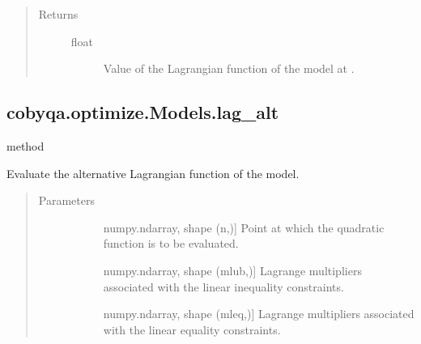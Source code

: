 \documentclass[letterpaper,10pt,english]{sphinxmanual}
\begin{document}
\begin{fulllineitems}
\begin{fulllineitems}
\begin{quote}
\begin{description}
\item[{Returns}] \leavevmode\begin{description}
\item[{float}] \leavevmode
\sphinxAtStartPar
Value of the Lagrangian function of the model at .

\end{description}

\end{description}\end{quote}

\end{fulllineitems}



\subsection{cobyqa.optimize.Models.lag\_alt}
\label{\detokenize{refs/generated/cobyqa.optimize.Models.lag_alt:cobyqa-optimize-models-lag-alt}}\label{\detokenize{refs/generated/cobyqa.optimize.Models.lag_alt::doc}}
\sphinxAtStartPar
method

\begin{fulllineitems}
\label{\detokenize{refs/generated/cobyqa.optimize.Models.lag_alt:cobyqa.optimize.Models.lag_alt}}
\sphinxAtStartPar
Evaluate the alternative Lagrangian function of the model.
\begin{quote}\begin{description}
\item[{Parameters}] \leavevmode\begin{description}
\item[{}] \leavevmode{[}numpy.ndarray, shape (n,){]}
\sphinxAtStartPar
Point at which the quadratic function is to be evaluated.

\item[{}] \leavevmode{[}numpy.ndarray, shape (mlub,){]}
\sphinxAtStartPar
Lagrange multipliers associated with the linear inequality
constraints.

\item[{}] \leavevmode{[}numpy.ndarray, shape (mleq,){]}
\sphinxAtStartPar
Lagrange multipliers associated with the linear equality
constraints.


\end{description}
\end{description}
\end{quote}
\end{fulllineitems}
\end{fulllineitems}
\end{document}
